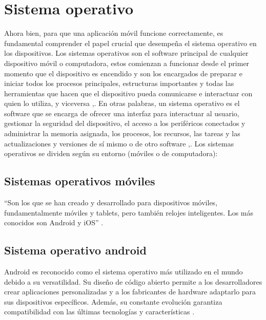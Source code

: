 
\section{Sistema operativo}

Ahora bien, para que una aplicación móvil funcione correctamente, es fundamental comprender el papel crucial que desempeña el sistema operativo en los dispositivos.
Los sistemas operativos son el software principal de cualquier dispositivo móvil o computadora, estos comienzan a funcionar desde el primer momento que el dispositivo es encendido y son los encargados de preparar e iniciar todos los procesos principales, estructuras importantes y todas las herramientas que hacen que el dispositivo pueda comunicarse e interactuar con quien lo utiliza, y viceversa \cite{CitaD1},\cite{CitaD2}.
En otras palabras, un sistema operativo es el software que se encarga de ofrecer una interfaz para interactuar al usuario, gestionar la seguridad del dispositivo, el acceso a los periféricos conectados y administrar la memoria asignada, los procesos, los recursos, las tareas y las actualizaciones y versiones de sí mismo o de otro software \cite{CitaD1},\cite{CitaD2}. 
Los sistemas operativos se dividen según su entorno (móviles o de computadora):

\subsection{Sistemas operativos móviles}

“Son los que se han creado y desarrollado para dispositivos móviles, fundamentalmente móviles y tablets, pero también relojes inteligentes. Los más conocidos son Android y iOS” \cite{CitaD2}.

\subsection{Sistema operativo android}

\begin{list}{}%
    {\setlength{\leftmargin}{1cm}\setlength{\rightmargin}{1cm}}
    \item\relax
    \small
    Android es reconocido como el sistema operativo más utilizado en el mundo debido a su versatilidad. Su diseño de código abierto permite a los desarrolladores crear aplicaciones personalizadas y a los fabricantes de hardware adaptarlo para sus dispositivos específicos. Además, su constante evolución garantiza compatibilidad con las últimas tecnologías y características \cite{CitaD3}.
    \end{list}

